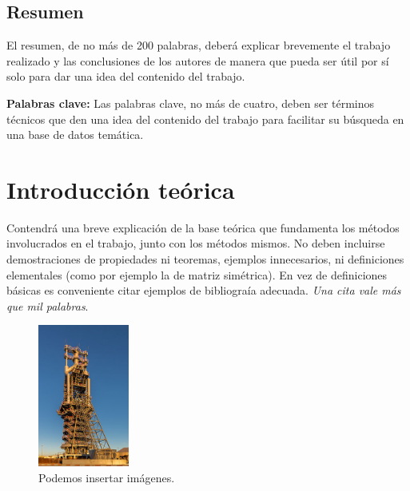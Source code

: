 \documentclass[11pt, a4paper, spanish]{article}
\let\strong\textbf
\begin{document}


\maketitle
\newpage

\begin{addmargin}[4em]{4em}

\section*{\centering Resumen}
  El resumen, de no más de 200 palabras, deberá explicar brevemente el trabajo realizado y las conclusiones de los autores de manera que pueda ser útil por sí solo para dar una idea del contenido del trabajo.

\vspace{4em}
\noindent \strong{Palabras clave:} Las palabras clave, no más de cuatro, deben ser términos técnicos que den una idea del contenido del trabajo para facilitar su búsqueda en una base de datos temática.

\end{addmargin}
\newpage

\tableofcontents
\newpage

\section{Introducción teórica}

  Contendrá una breve explicación de la base teórica que fundamenta los métodos involucrados en el trabajo, junto con los métodos mismos. No deben incluirse demostraciones de propiedades ni teoremas, ejemplos innecesarios, ni definiciones elementales (como por ejemplo la de matriz simétrica). En vez de definiciones básicas es conveniente citar ejemplos de bibliograía adecuada. \emph{Una cita vale más que mil palabras}.

  \begin{figure}[h]
    \centering
    \includegraphics[width=3cm]{altoHorno.jpg}
    \caption{Podemos insertar imágenes.}
  \end{figure}
\end{document}
